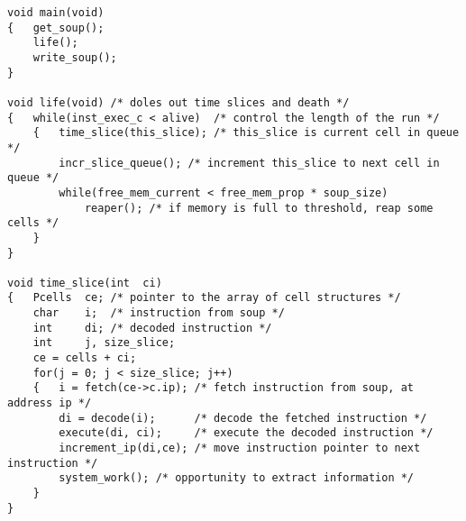 \begin{verbatim}
void main(void)
{   get_soup();
    life();
    write_soup();
}

void life(void) /* doles out time slices and death */
{   while(inst_exec_c < alive)  /* control the length of the run */
    {   time_slice(this_slice); /* this_slice is current cell in queue */
        incr_slice_queue(); /* increment this_slice to next cell in queue */
        while(free_mem_current < free_mem_prop * soup_size)
            reaper(); /* if memory is full to threshold, reap some cells */
    }
}

void time_slice(int  ci)
{   Pcells  ce; /* pointer to the array of cell structures */
    char    i;  /* instruction from soup */
    int     di; /* decoded instruction */
    int     j, size_slice;
    ce = cells + ci;
    for(j = 0; j < size_slice; j++)
    {   i = fetch(ce->c.ip); /* fetch instruction from soup, at address ip */
        di = decode(i);      /* decode the fetched instruction */
        execute(di, ci);     /* execute the decoded instruction */
        increment_ip(di,ce); /* move instruction pointer to next instruction */
        system_work(); /* opportunity to extract information */
    }
}


\end{verbatim}
